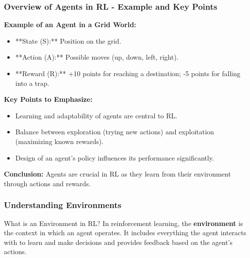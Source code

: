 \documentclass{beamer}
\begin{document}
\begin{frame}[fragile]
    \frametitle{Overview of Agents in RL - Example and Key Points}

    \textbf{Example of an Agent in a Grid World:}
    \begin{itemize}
        \item **State (S):** Position on the grid.
        \item **Action (A):** Possible moves (up, down, left, right).
        \item **Reward (R):** +10 points for reaching a destination; -5 points for falling into a trap.
    \end{itemize}

    \textbf{Key Points to Emphasize:}
    \begin{itemize}
        \item Learning and adaptability of agents are central to RL.
        \item Balance between exploration (trying new actions) and exploitation (maximizing known rewards).
        \item Design of an agent's policy influences its performance significantly.
    \end{itemize}

    \textbf{Conclusion:} Agents are crucial in RL as they learn from their environment through actions and rewards.
\end{frame}

\begin{frame}[fragile]
    \frametitle{Understanding Environments}
    \begin{block}{What is an Environment in RL?}
        In reinforcement learning, the \textbf{environment} is the context in which an agent operates. It includes everything the agent interacts with to learn and make decisions and provides feedback based on the agent's actions.
    \end{block}
\end{frame}
\end{document}
